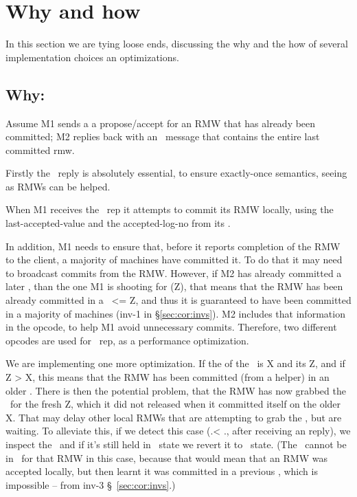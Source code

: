 \section{Why and how} \label{sec:why}

In this section we are tying loose ends, discussing the why and the how of several implementation choices an optimizations.


\subsection{Why: \alreadycom} \label{sec:why:alreadycom}
Assume M1 sends a a propose/accept for an RMW that has already been committed; M2 replies
back with an \alreadycom~message that contains the entire last committed rmw.


Firstly the \alreadycom~reply is absolutely essential, to ensure exactly-once semantics, seeing as RMWs can be helped. 

When M1 receives the \alreadycom~rep it attempts to commit its RMW locally, using the last-accepted-value and the accepted-log-no from its \locentry.

In addition, M1 needs to ensure that, before it reports completion of the RMW to the client, a majority of machines have committed it.
To do that it may need to broadcast commits from the RMW.
However, if M2 has already committed a later \lognox, than the one M1 is shooting for (\eg \lognoeq Z), that means that the RMW has been already committed in a \logno~<= Z, and thus it is guaranteed to have been committed in a majority of machines (inv-1 in \S\ref{sec:cor:invs}).
M2 includes that information in the opcode, to help M1 avoid unnecessary commits.
Therefore, two different opcodes are used for \alreadycom~rep, as a performance optimization.

\custvspace{}
We are implementing one more optimization.
If the \acclogno of the \locentry~is  X and its \lognoeq Z, and if Z > X, this means that the RMW has been committed (from a helper) in an older \logno. 
There is then the potential problem, that the RMW has now grabbed the \kv~for the fresh \lognoeq Z, which it did not released when it committed itself on the older \lognoeq X.
That may delay other local RMWs that are attempting to grab the \kv, but are waiting.
To alleviate this, if we detect this case (\locentry.\acclogno < \locentry.\logno, after receiving an \alreadycom reply), we inspect the \kv~and if it's still held in \proped~state we revert it to \invalid~state. (The \kv~cannot be in \acced~for that RMW in this case, because that would mean that an RMW was accepted locally, but then learnt it was committed in a previous \logno, which is impossible -- from inv-3 \S~\ref{sec:cor:invs}.)

